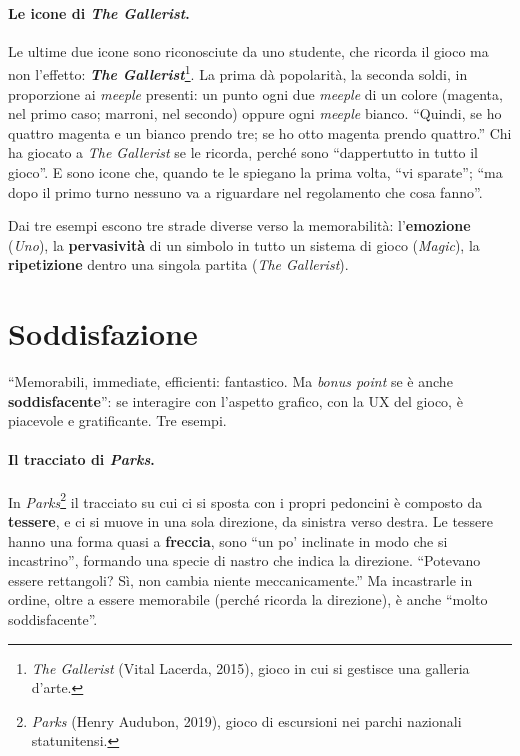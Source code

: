 \paragraph{Le icone di \emph{The Gallerist}.} Le ultime due icone sono riconosciute da
uno studente, che ricorda il gioco ma non l'effetto: \textbf{\emph{The
Gallerist}}\footnote{\emph{The Gallerist} (Vital Lacerda, 2015), gioco in cui si
gestisce una galleria d'arte.}. La prima dà popolarità, la seconda soldi, in proporzione
ai \emph{meeple} presenti: un punto ogni due \emph{meeple} di un colore (magenta, nel
primo caso; marroni, nel secondo) oppure ogni \emph{meeple} bianco. ``Quindi, se ho
quattro magenta e un bianco prendo tre; se ho otto magenta prendo quattro.'' Chi ha
giocato a \emph{The Gallerist} se le ricorda, perché sono ``dappertutto in tutto il
gioco''. E sono icone che, quando te le spiegano la prima volta, ``vi sparate''; ``ma
dopo il primo turno nessuno va a riguardare nel regolamento che cosa fanno''.

Dai tre esempi escono tre strade diverse verso la memorabilità: l'\textbf{emozione}
(\emph{Uno}), la \textbf{pervasività} di un simbolo in tutto un sistema di gioco
(\emph{Magic}), la \textbf{ripetizione} dentro una singola partita (\emph{The
Gallerist}).

\section{Soddisfazione}
\label{a10:sec:soddisfazione}



``Memorabili, immediate, efficienti: fantastico. Ma \emph{bonus point} se è anche
\textbf{soddisfacente}'': se interagire con l'aspetto grafico, con la UX del gioco, è
piacevole e gratificante. Tre esempi.

\paragraph{Il tracciato di \emph{Parks}.} In \emph{Parks}\footnote{\emph{Parks}
(Henry Audubon, 2019), gioco di escursioni nei parchi nazionali statunitensi.} il
tracciato su cui ci si sposta con i propri pedoncini è composto da \textbf{tessere}, e
ci si muove in una sola direzione, da sinistra verso destra. Le tessere hanno una forma
quasi a \textbf{freccia}, sono ``un po' inclinate in modo che si incastrino'', formando
una specie di nastro che indica la direzione. ``Potevano essere rettangoli? Sì, non
cambia niente meccanicamente.'' Ma incastrarle in ordine, oltre a essere memorabile
(perché ricorda la direzione), è anche ``molto soddisfacente''.

